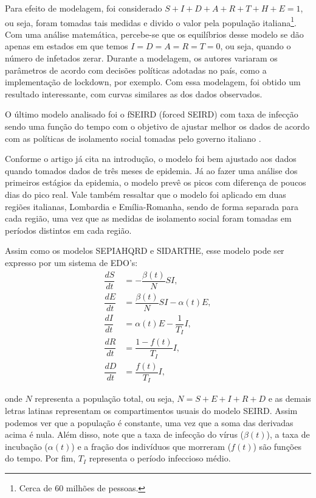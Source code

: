 \documentclass{article}
\begin{document}
Para efeito de modelagem, foi considerado $S + I + D + A + R + T + H + E = 1$, ou seja, foram tomadas tais medidas e divido o valor pela população italiana\footnote{Cerca de 60 milhões de pessoas.}. Com uma análise matemática, percebe-se que os equilíbrios desse modelo se dão apenas em estados em que temos $I = D = A = R = T = 0$, ou seja, quando o número de infetados zerar. Durante a modelagem, os autores variaram os parâmetros de acordo com decisões políticas adotadas no país, como a implementação de lockdown, por exemplo. Com essa modelagem, foi obtido um resultado interessante, com curvas similares as dos dados observados.
% 

O último modelo analisado foi o fSEIRD (forced SEIRD) com taxa de infecção sendo uma função do tempo com o objetivo de ajustar melhor os dados de acordo com as políticas de isolamento social tomadas pelo governo italiano \cite{piccolomini}.

Conforme o artigo já cita na introdução, o modelo foi bem ajustado aos dados quando tomados dados de três meses de epidemia. Já ao fazer uma análise dos primeiros estágios da epidemia, o modelo prevê os picos com diferença de poucos dias do pico real. Vale também ressaltar que o modelo foi aplicado em duas regiões italianas, Lombardia e Emília-Romanha, sendo de forma separada para cada região, uma vez que as medidas de isolamento social foram tomadas em períodos distintos em cada região.

Assim como os modelos SEPIAHQRD e SIDARTHE, esse modelo pode ser expresso por um sistema de EDO's:
\begin{equation}
    \label{piccolomini_model}
    \begin{split}
        \dfrac{dS}{dt} & = -\dfrac{\beta(t)}{N}SI, \\
        \dfrac{dE}{dt} & = \dfrac{\beta(t)}{N}SI - \alpha(t) E, \\
        \dfrac{dI}{dt} & = \alpha(t) E - \dfrac{1}{T_I}I, \\
        \dfrac{dR}{dt} & = \dfrac{1 - f(t)}{T_I}I, \\
        \dfrac{dD}{dt} & = \dfrac{f(t)}{T_I}I,
    \end{split}
\end{equation}

\noindent onde $N$ representa a população total, ou seja, $N = S + E + I + R + D$ e as demais letras latinas representam os compartimentos usuais do modelo SEIRD. Assim podemos ver que a população é constante, uma vez que a soma das derivadas acima é nula. Além disso, note que a taxa de infecção do vírus ($\beta(t)$), a taxa de incubação ($\alpha(t)$) e a fração dos indivíduos que morreram ($f(t)$) são funções do tempo. Por fim, $T_I$ representa o período infeccioso médio.
\end{document}
